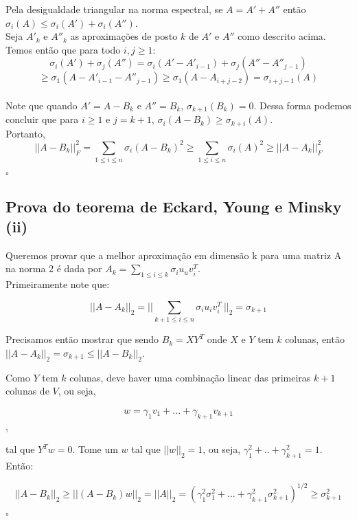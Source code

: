 Pela desigualdade triangular na norma espectral, se $A = A'+A''$ então $\sigma_i(A)\leq \sigma_i(A') +\sigma_i(A'')$.\\

Seja $A'_k$ e $A''_k$ as aproximações de posto $k$ de $A'$ e $A''$ como descrito acima. Temos então que para todo $i,j\geq 1$:
\[\sigma_i(A') +\sigma_j(A'') =  \sigma_i(A'- A'_{i-1}) +\sigma_j(A''-A''_{j-1}) \]
\[\geq \sigma_1 (A-A'_{i-1}-A''_{j-1})\geq \sigma_1 (A-A_{i+j-2}) = \sigma_{i+j-1}(A)   \]\\
Note que quando $A'=A-B_k$ e $A''=B_k$, $\sigma_{k+1}(B_k)=0$. Dessa forma podemos concluir que para $i\geq1$ e $j=k+1$, $\sigma_i(A-B_k)\geq \sigma_{k+i}(A)$.\\

Portanto, 
\[||A-B_k||^2_F =\sum_{1\leq i \leq n} \sigma_i (A-B_k)^2 \geq 
 \sum_{1\leq i \leq n} \sigma_i (A)^2 \geq||A-A_k||^2_F  \]

\begin{flushright}
$\square$
\end{flushright}

\subsection{Prova do teorema de Eckard, Young e Minsky (ii)}

Queremos provar que a melhor aproximação em dimensão k para uma matriz A na norma 2 é dada por $A_k = \sum_{1\leq i \leq k} \sigma_i u_u v_i^T $.\\


Primeiramente note que:

\[||A-A_k||_2 =|| \sum_{k+1\leq i \leq n} \sigma_i u_i v_i^T   \ ||_2 =\sigma_{k+1} \]

Precisamos então mostrar que sendo $B_k = XY^T$ onde $X$ e $Y$ tem $k$ colunas, então $||A-A_k||_2=\sigma_{k+1}\leq ||A-B_k||_2$.

Como $Y$ tem $k$ colunas, deve haver uma combinação linear das primeiras $k+1$ colunas de $V$, ou seja,

\[w=\gamma_1v_1+...+\gamma_{k+1}v_{k+1}    \],

tal que $Y^Tw=0$. Tome um $w$ tal que $||w||_2=1$, ou seja, $\gamma_1^2+..+\gamma_{k+1}^2=1$. Então:

\[||A-B_k||_2\geq||(A-B_k)w||_2=||A||_2 = (\gamma_1^2\sigma_1^2+...+\gamma_{k+1}^2\sigma_{k+1}^2)^{1/2} \geq \sigma_{k+1}^2     \]

\begin{flushright}
$\square$
\end{flushright}



